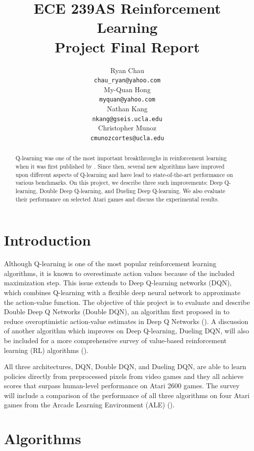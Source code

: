 \documentclass{article}
\title{ECE 239AS Reinforcement Learning\\
       Project Final Report}
\author{%
    Ryan Chau \\
    \texttt{chau\_ryan@yahoo.com}\\
    \And
    My-Quan Hong \\
    \texttt{myquan@yahoo.com} \\
    \And
    Nathan Kang \\
    \texttt{nkang@gseis.ucla.edu} \\
    \And
    Christopher Munoz \\
    \texttt{cmunozcortes@ucla.edu} \\
}
\begin{document}
\maketitle

\begin{abstract}
    Q-learning was one of the most important breakthroughs in reinforcement
    learning when it was first published by \cite{watkins1989learning}. Since
    then, several new algorithms have improved upon different aspects of
    Q-learning and have lead to state-of-the-art performance on various
    benchmarks. On this project, we describe three such improvements: Deep
    Q-learning, Double Deep Q-learning, and Dueling Deep Q-learning. We also
    evaluate their performance on selected Atari games and discuss the
    experimental results.
\end{abstract}

\section{Introduction}
Although Q-learning is one of the most popular reinforcement learning
algorithms, it is known to overestimate action values because of the included
maximization step. This issue extends to Deep Q-learning networks (DQN), which
combines Q-learning with a flexible deep neural network to approximate the
action-value function. The objective of this project is to evaluate and describe
Double Deep Q Networks (Double DQN), an algorithm first proposed in
\citet{van2016deep} to reduce overoptimistic action-value estimates in Deep Q
Networks (\cite{mnih2015human}). A discussion of another algorithm which
improves on Deep Q-learning, Dueling DQN, will also be included for a more
comprehensive survey of value-based reinforcement learning (RL) algorithms
(\cite{wang2016dueling}).

All three architectures, DQN, Double DQN, and Dueling DQN, are able to learn
policies directly from preprocessed pixels from video games and they all achieve
scores that surpass human-level performance on Atari 2600 games.  The survey
will include a comparison of the performance of all three algorithms on four
Atari games from the Arcade Learning Environment (ALE)
(\cite{bellemare2013arcade}).

\section{Algorithms}
\end{document}
